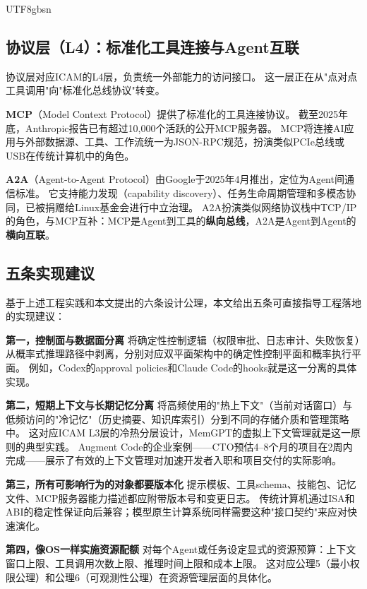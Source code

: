 \documentclass[11pt,a4paper]{article}
\begin{document}
\begin{CJK*}{UTF8}{gbsn}
\subsection{协议层（L4）：标准化工具连接与Agent互联}

协议层对应ICAM的L4层，负责统一外部能力的访问接口。
这一层正在从"点对点工具调用"向"标准化总线协议"转变。

\textbf{MCP}（Model Context Protocol）提供了标准化的工具连接协议\cite{mcp_intro_2026}。
截至2025年底，Anthropic报告已有超过10{,}000个活跃的公开MCP服务器\cite{mcpadoption2026}。
MCP将连接AI应用与外部数据源、工具、工作流统一为JSON-RPC规范，扮演类似PCIe总线或USB在传统计算机中的角色。

\textbf{A2A}（Agent-to-Agent Protocol）由Google于2025年4月推出，定位为Agent间通信标准\cite{google_a2a_2025,agentprotocols2025}。
它支持能力发现（capability discovery）、任务生命周期管理和多模态协同，已被捐赠给Linux基金会进行中立治理\cite{a2alinux2025}。
A2A扮演类似网络协议栈中TCP/IP的角色，与MCP互补：MCP是Agent到工具的\textbf{纵向总线}，A2A是Agent到Agent的\textbf{横向互联}。

\subsection{五条实现建议}

基于上述工程实践和本文提出的六条设计公理，本文给出五条可直接指导工程落地的实现建议：

\textbf{第一，控制面与数据面分离}
将确定性控制逻辑（权限审批、日志审计、失败恢复）从概率式推理路径中剥离，分别对应双平面架构中的确定性控制平面和概率执行平面。
例如，Codex的approval policies和Claude Code的hooks就是这一分离的具体实现\cite{openai_codex_approvals_2026,anthropic_claudecode_security_2026}。

\textbf{第二，短期上下文与长期记忆分离}
将高频使用的"热上下文"（当前对话窗口）与低频访问的"冷记忆"（历史摘要、知识库索引）分到不同的存储介质和管理策略中。
这对应ICAM L3层的冷热分层设计，MemGPT的虚拟上下文管理就是这一原则的典型实践\cite{memgpt2023}。
Augment Code的企业案例——CTO预估4--8个月的项目在2周内完成\cite{anthropic2026agenticreport}——展示了有效的上下文管理对加速开发者入职和项目交付的实际影响。

\textbf{第三，所有可影响行为的对象都要版本化}
提示模板、工具schema、技能包、记忆文件、MCP服务器能力描述都应附带版本号和变更日志\cite{mcp_intro_2026,agentprotocols2025}。
传统计算机通过ISA和ABI的稳定性保证向后兼容；模型原生计算系统同样需要这种"接口契约"来应对快速演化。

\textbf{第四，像OS一样实施资源配额}
对每个Agent或任务设定显式的资源预算：上下文窗口上限、工具调用次数上限、推理时间上限和成本上限\cite{linux_cgroup_2026}。
这对应公理5（最小权限公理）和公理6（可观测性公理）在资源管理层面的具体化。


\end{CJK*}
\end{document}
